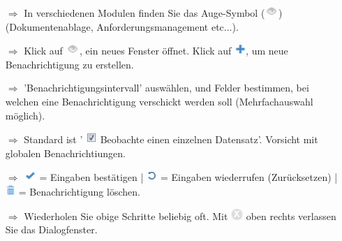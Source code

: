 \documentclass{article}
\begin{document}
\begin{multicols}{2}

\begin{tcolorbox}[colback=blue!5,colframe=blue!40!black,title=Benachrichtigungen einrichten]
\begin{itemize}
  \item[$\Longrightarrow$] In verschiedenen Modulen finden Sie das Auge-Symbol (\includegraphics[height=12pt]{Icons/Auge_g.jpg}) (Dokumentenablage, Anforderungsmanagement etc...).
  \item[$\Longrightarrow$] Klick auf \includegraphics[height=12pt]{Icons/Auge_g.jpg}, ein neues Fenster öffnet. Klick auf \includegraphics[height=12pt]{Icons/Pluszeichen.jpg}, um neue Benachrichtigung zu erstellen.
  \item[$\Longrightarrow$] 'Benachrichtigungsintervall' auswählen, und Felder bestimmen, bei welchen eine Benachrichtigung verschickt werden soll (Mehrfachauswahl möglich).
	\item[$\Longrightarrow$] Standard ist ' \includegraphics[height=12pt]{Icons/checkbox_markiert.jpg} Beobachte einen einzelnen Datensatz'. Vorsicht mit globalen Benachrichtiungen.
  \item[$\Longrightarrow$] \includegraphics[height=12pt]{Icons/Gutzeichen.jpg} = Eingaben bestätigen | \includegraphics[height=12pt]{Icons/Refresh.jpg} = Eingaben wiederrufen (Zurücksetzen) | \includegraphics[height=12pt]{Icons/Muelltonne.jpg} = Benachrichtigung löschen.
  \item[$\Longrightarrow$] Wiederholen Sie obige Schritte beliebig oft. Mit \includegraphics[height=12pt]{Icons/X_Button.jpg} oben rechts verlassen Sie das Dialogfenster.
\end{itemize}
\end{tcolorbox}



\end{multicols}
\end{document}
